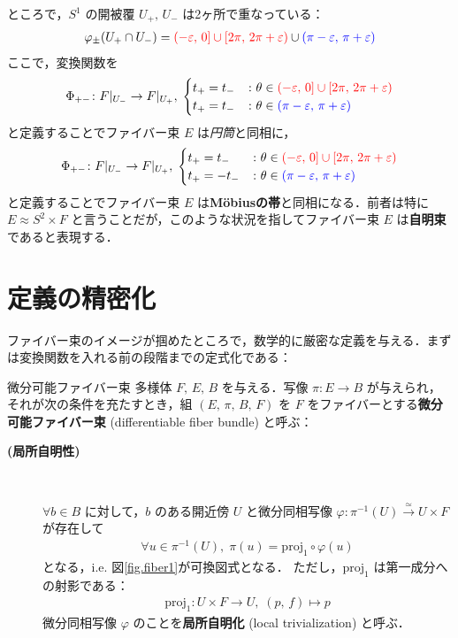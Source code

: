 \documentclass[geometry_main]{subfiles}
\begin{document}
ところで，$S^1$ の開被覆 $U_+,\, U_-$ は2ヶ所で重なっている：
\begin{align}
	\varphi_{\pm}(U_+ \cap U_-) = \textcolor{red}{(-\varepsilon,\, 0] \cup [2\pi,\, 2\pi + \varepsilon)} \cup \textcolor{blue}{(\pi-\varepsilon,\, \pi + \varepsilon)}
\end{align}
ここで，変換関数を
\begin{align}
	\Phi_{+-} \colon F|_{U_-} \to F|_{U_+},\; 
	\begin{cases}
		t_+ = t_- & \colon \theta \in \textcolor{red}{(-\varepsilon,\, 0] \cup [2\pi,\, 2\pi + \varepsilon)} \\
		t_+ = t_- &	\colon \theta \in \textcolor{blue}{(\pi-\varepsilon,\, \pi + \varepsilon)}
	\end{cases}
\end{align}
と定義することでファイバー束 $E$ は\emph{円筒}と同相に， 
\begin{align}
	\Phi_{+-} \colon F|_{U_-} \to F|_{U_+},\; 
	\begin{cases}
		t_+ = t_- & \colon \theta \in \textcolor{red}{(-\varepsilon,\, 0] \cup [2\pi,\, 2\pi + \varepsilon)} \\
		t_+ = -t_- & \colon \theta \in \textcolor{blue}{(\pi-\varepsilon,\, \pi + \varepsilon)}
	\end{cases}
\end{align}
と定義することでファイバー束 $E$ は\textbf{M\"obiusの帯}と同相になる．前者は特に $E \approx S^2 \times F$ と言うことだが，このような状況を指してファイバー束 $E$ は\textbf{自明束}であると表現する．

\section{定義の精密化}

ファイバー束のイメージが掴めたところで，数学的に厳密な定義を与える．まずは変換関数を入れる前の段階までの定式化である：

\begin{mydef}[label=def.fiber-1]{微分可能ファイバー束}
	\cinfty 多様体 $F,\, E,\, B$ を与える．\cinfty 写像 $\pi \colon E \to B$ が与えられ，それが次の条件を充たすとき，組 $(E,\, \pi ,\, B,\, F)$ を $F$ をファイバーとする\textbf{微分可能ファイバー束} (differentiable fiber bundle) と呼ぶ：
	\begin{description}
		\item[\textbf{(局所自明性)}]　
		
		$\forall b \in B$ に対して，$b$ のある開近傍 $U$ と微分同相写像 $\varphi \colon \pi^{-1}(U) \xrightarrow{\simeq} U \times F$ が存在して
		\begin{align}
			\forall u \in \pi^{-1} (U),\; \pi(u) = \mathrm{proj}_1 \circ \varphi(u)
		\end{align}
		となる，i.e. 図\ref{fig.fiber1}が可換図式となる．
		ただし，$\mathrm{proj}_1$ は第一成分への射影である：
		\begin{align}
			\mathrm{proj}_1 \colon U \times F \to U ,\; (p,\, f) \mapsto p
		\end{align}
		微分同相写像 $\varphi$ のことを\textbf{局所自明化} (local trivialization) と呼ぶ．
	\end{description}
\end{mydef}
\end{document}
